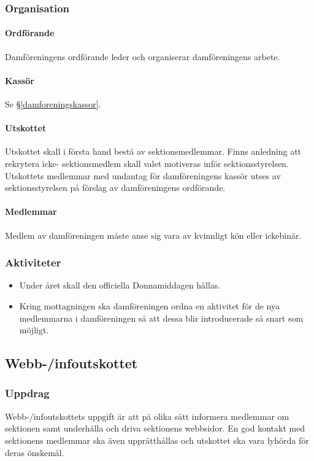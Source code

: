 \documentclass{datateknologsektionen-document}
\begin{document}
\subsubsection{Organisation}
\paragraph{Ordförande}
Damföreningens ordförande leder och organiserar damföreningens arbete.
\paragraph{Kassör}
Se \S \ref{damforeningskassor}.
\paragraph{Utskottet}

Utskottet skall i första hand bestå av sektionsmedlemmar. Finns anledning att rekrytera icke-
sektionsmedlem skall valet motiveras inför sektionsstyrelsen. Utskottets medlemmar med 
undantag för damföreningens kassör utses av sektionsstyrelsen på förslag av damföreningens
ordförande.
\paragraph{Medlemmar}
Medlem av damföreningen måste anse sig vara av kvinnligt kön eller ickebinär.
\subsubsection{Aktiviteter}
\begin{itemize}
  \item Under året skall den officiella Donnamiddagen hållas.
  \item Kring mottagningen ska damföreningen ordna en aktivitet för de nya medlemmarna i damföreningen så att dessa blir introducerade så snart som möjligt.
\end{itemize}

\subsection{Webb-/infoutskottet}
\label{webbinfo}
\subsubsection{Uppdrag}
Webb-/infoutskottets uppgift är att på olika sätt informera medlemmar om sektionen samt
underhålla och driva sektionens webbsidor. En god kontakt med sektionens medlemmar ska
även upprätthållas och utskottet ska vara lyhörda för deras önskemål.
\end{document}
